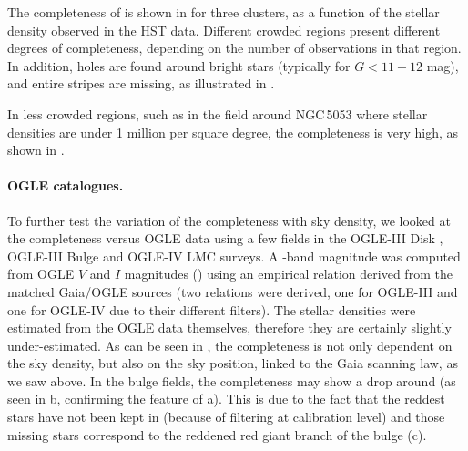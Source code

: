 The completeness of {} is shown in  for three clusters, as a function of the stellar density observed in the HST data. Different crowded regions present different degrees of completeness, depending on the number of observations in that region. In addition, holes are found around bright stars (typically for $G<11-12$ mag), and entire stripes are missing, as illustrated in . 





In less crowded regions, such as in the field around NGC\,5053 where stellar densities are under 1 million per square degree, the completeness is very high, as shown in .
 
 


\paragraph{OGLE catalogues.} To further test the variation of the completeness with sky density, we looked at the completeness versus OGLE data using a few fields in the OGLE-III Disk \citep{2010AcA....60..295S}, OGLE-III Bulge \citep{2011AcA....61...83S} and OGLE-IV LMC \citep{2012AcA....62..219S} surveys. A \gmag-band magnitude was computed from OGLE $V$ and $I$ magnitudes (\goggle) using an empirical relation derived from the matched Gaia/OGLE sources (two relations were derived, one for OGLE-III and one for OGLE-IV due to their different filters). The stellar densities were estimated from the OGLE data themselves, therefore they are certainly slightly under-estimated. As can be seen in , the completeness is not only dependent on the sky density, but also on the sky position, linked to the Gaia scanning law, as we saw above. In the bulge fields, the completeness may show a drop around  (as seen in b, confirming the feature of a). This is due to the fact that the reddest stars have not been kept in {} (because of filtering at calibration level) and those missing stars correspond to the reddened red giant branch of the bulge (c).  


